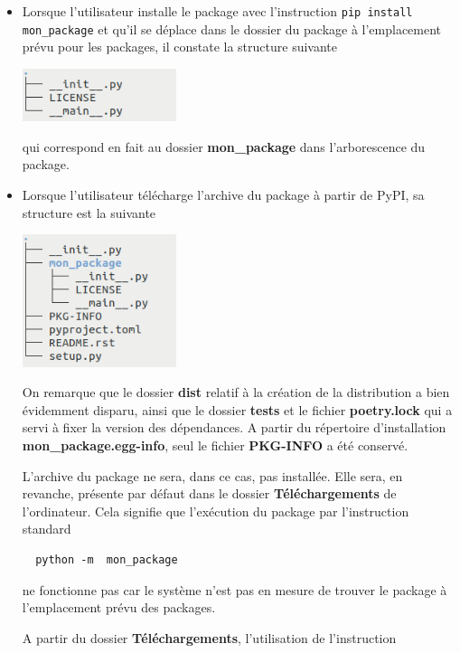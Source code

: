 \documentclass[twoside,a4paper,11pt,frenchb,openany]{report}
\begin{document}
\begin{itemize}
\item Lorsque l'utilisateur installe le package avec l'instruction \texttt{pip install mon\_package} et qu'il se déplace dans le dossier du package à l'emplacement prévu pour les packages, il constate la structure suivante

\includegraphics[width=4.5cm]{mon_package_poetry.png}

qui correspond en fait au dossier \textbf{mon\_package} dans l'arborescence du package.

\item Lorsque l'utilisateur télécharge l'archive du package à partir de PyPI, sa structure est la suivante 

\includegraphics[width=4.5cm]{mon_package_poetry_archive.png}

On remarque que le dossier \textbf{dist} relatif à la création de la distribution a bien évidemment disparu, ainsi que le dossier \textbf{tests} et le fichier \textbf{poetry.lock} qui a servi à fixer la version des dépendances. A partir du répertoire d'installation \textbf{mon\_package.egg-info}, seul le fichier \textbf{PKG-INFO} a été conservé.

L'archive du package ne sera, dans ce cas, pas installée. Elle sera, en revanche, présente par défaut dans le dossier \textbf{Téléchargements} de l'ordinateur. Cela signifie que l'exécution du package par l'instruction standard

\begin{verbatim}
  python -m  mon_package
\end{verbatim} 

ne fonctionne pas car le système n'est pas en mesure de trouver le package à l'emplacement prévu des packages.

A partir du dossier \textbf{Téléchargements}, l'utilisation de l'instruction 


\end{itemize}
\end{document}
